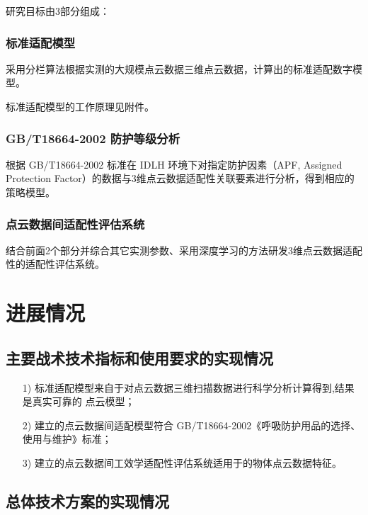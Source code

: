 \documentclass[a4paper,12pt]{ctexbook}	%
\begin{document}
研究目标由3部分组成：

\subsection{标准适配模型}

采用分栏算法根据实测的大规模点云数据三维点云数据，计算出的标准适配数字模型。

标准适配模型的工作原理见附件。

\subsection{GB/T18664-2002 防护等级分析}

根据 GB/T18664-2002 标准在 IDLH 环境下对指定防护因素（APF, Assigned Protection 
Factor）的数据与3维点云数据适配性关联要素进行分析，得到相应的策略模型。

\subsection{点云数据间适配性评估系统}

结合前面2个部分并综合其它实测参数、采用深度学习的方法研发3维点云数据适配性的适配性评估系统。

\chapter{进展情况}

\section{主要战术技术指标和使用要求的实现情况}

\begin{itemize}
\setlength{\parskip}{0pt}
\item[1)]
标准适配模型来自于对点云数据三维扫描数据进行科学分析计算得到,结果是真实可靠的
点云模型；
\item[2)]
建立的点云数据间适配模型符合 GB/T18664-2002《呼吸防护用品的选择、使用与维护》标准；
\item[3)]
建立的点云数据间工效学适配性评估系统适用于的物体点云数据特征。
\end{itemize}



\section{总体技术方案的实现情况}
\end{document}
